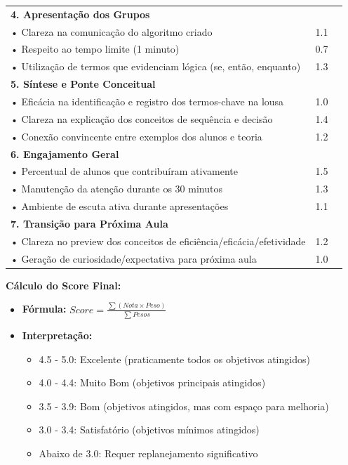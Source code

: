 \documentclass{lesson_plan}
\begin{document}
\begin{center}
{\begin{tabular}{|p{10cm}|c|c|}
\hline
\textbf{4. Apresentação dos Grupos} & & \\
\hspace{0.2cm} • Clareza na comunicação do algoritmo criado & 1.1 & \\
\hspace{0.2cm} • Respeito ao tempo limite (1 minuto) & 0.7 & \\
\hspace{0.2cm} • Utilização de termos que evidenciam lógica (se, então, enquanto) & 1.3 & \\
\hline
\textbf{5. Síntese e Ponte Conceitual} & & \\
\hspace{0.2cm} • Eficácia na identificação e registro dos termos-chave na lousa & 1.0 & \\
\hspace{0.2cm} • Clareza na explicação dos conceitos de sequência e decisão & 1.4 & \\
\hspace{0.2cm} • Conexão convincente entre exemplos dos alunos e teoria & 1.2 & \\
\hline
\textbf{6. Engajamento Geral} & & \\
\hspace{0.2cm} • Percentual de alunos que contribuíram ativamente & 1.5 & \\
\hspace{0.2cm} • Manutenção da atenção durante os 30 minutos & 1.3 & \\
\hspace{0.2cm} • Ambiente de escuta ativa durante apresentações & 1.1 & \\
\hline
\textbf{7. Transição para Próxima Aula} & & \\
\hspace{0.2cm} • Clareza no preview dos conceitos de eficiência/eficácia/efetividade & 1.2 & \\
\hspace{0.2cm} • Geração de curiosidade/expectativa para próxima aula & 1.0 & \\
\hline
\end{tabular}
}
\end{center}

\textbf{Cálculo do Score Final:}
\begin{itemize}
\item \textbf{Fórmula:} \( Score = \frac{\sum (Nota \times Peso)}{\sum Pesos} \)
\item \textbf{Interpretação:}
\begin{itemize}
\item 4.5 - 5.0: Excelente (praticamente todos os objetivos atingidos)
\item 4.0 - 4.4: Muito Bom (objetivos principais atingidos)
\item 3.5 - 3.9: Bom (objetivos atingidos, mas com espaço para melhoria)
\item 3.0 - 3.4: Satisfatório (objetivos mínimos atingidos)
\item Abaixo de 3.0: Requer replanejamento significativo
\end{itemize}
\end{itemize}
\end{document}
